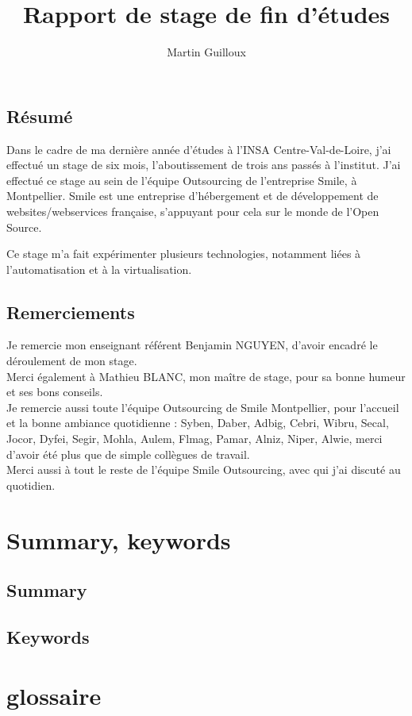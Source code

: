 \documentclass[12 pt]{report}
\title{\textbf{Rapport de stage de fin d'études}}
\author{Martin Guilloux}
\begin{document}
\maketitle

\section*{Résumé}
Dans le cadre de ma dernière année d'études à l'INSA Centre-Val-de-Loire, j'ai effectué un stage de six mois, l'aboutissement de trois ans passés à l'institut. J'ai effectué ce stage au sein de l'équipe Outsourcing de l'entreprise Smile, à Montpellier. Smile est une entreprise d'hébergement et de développement de websites/webservices française, s'appuyant pour cela sur le monde de l'Open Source.

Ce stage m'a fait expérimenter plusieurs technologies, notamment liées à l'automatisation et à la virtualisation.

\section*{Remerciements}
Je remercie mon enseignant référent Benjamin NGUYEN, d'avoir encadré le déroulement de mon stage.\\
Merci également à Mathieu BLANC, mon maître de stage, pour sa bonne humeur et ses bons conseils.\\
Je remercie aussi toute l'équipe Outsourcing de Smile Montpellier, pour l'accueil et la bonne ambiance quotidienne : Syben, Daber, Adbig, Cebri, Wibru, Secal, Jocor, Dyfei, Segir, Mohla, Aulem, Flmag, Pamar, Alniz, Niper, Alwie, merci d'avoir été plus que de simple collègues de travail.\\
Merci aussi à tout le reste de l'équipe Smile Outsourcing, avec qui j'ai discuté au quotidien.


\tableofcontents

\chapter*{Summary, keywords}
\section*{Summary}
\lipsum[1]\lipsum[1]
\section*{Keywords}
\lipsum[1]


\chapter{glossaire}
\end{document}
